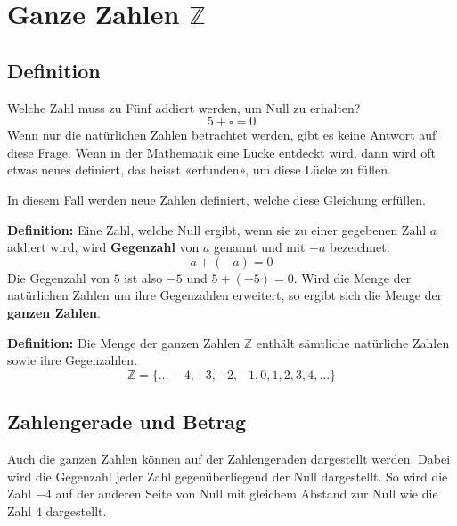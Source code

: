 \newpage
\section{Ganze Zahlen $\mathbb{Z}$}

\subsection{Definition}

Welche Zahl muss zu Fünf addiert werden, um Null zu erhalten?
\[
  5 + \square = 0
\]
Wenn nur die natürlichen Zahlen betrachtet werden, gibt es keine Antwort auf diese Frage. Wenn in der Mathematik eine Lücke entdeckt wird, dann wird oft etwas neues definiert, das heisst «erfunden», um diese Lücke zu füllen.

In diesem Fall werden neue Zahlen definiert, welche diese Gleichung erfüllen.

\textbf{Definition:} Eine Zahl, welche Null ergibt, wenn sie zu einer gegebenen Zahl $a$ addiert wird, wird \textbf{Gegenzahl} von $a$ genannt und mit $-a$ bezeichnet:
\[
  a + (-a) = 0
\]
Die Gegenzahl von $5$ ist also $-5$ und $5 + (-5) = 0$. Wird die Menge der natürlichen Zahlen um ihre Gegenzahlen erweitert, so ergibt sich die Menge der \textbf{ganzen Zahlen}.

\textbf{Definition:} Die Menge der ganzen Zahlen $\mathbb{Z}$ enthält sämtliche natürliche Zahlen sowie ihre Gegenzahlen.
\[
  \mathbb{Z} = \{\ldots -4, -3, -2, -1, 0, 1, 2, 3, 4, \ldots\}
\]

\subsection{Zahlengerade und Betrag}

Auch die ganzen Zahlen können auf der Zahlengeraden dargestellt werden. Dabei wird die Gegenzahl jeder Zahl gegenüberliegend der Null dargestellt. So wird die Zahl $-4$ auf der anderen Seite von Null mit gleichem Abstand zur Null wie die Zahl $4$ dargestellt.

\begin{center}
\end{center}


